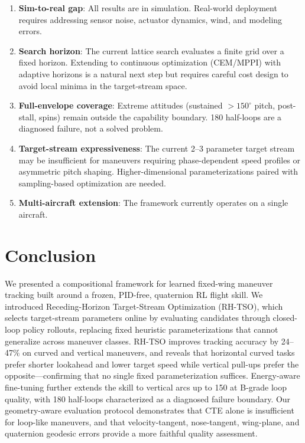 \documentclass{article}
\begin{document}
\begin{enumerate}
  \item \textbf{Sim-to-real gap}: All results are in simulation. Real-world deployment requires addressing sensor noise, actuator dynamics, wind, and modeling errors.
  \item \textbf{Search horizon}: The current lattice search evaluates a finite grid over a fixed horizon. Extending to continuous optimization (CEM/MPPI) with adaptive horizons is a natural next step but requires careful cost design to avoid local minima in the target-stream space.
  \item \textbf{Full-envelope coverage}: Extreme attitudes (sustained $>150^\circ$ pitch, post-stall, spins) remain outside the capability boundary. 180\textdegree{} half-loops are a diagnosed failure, not a solved problem.
  \item \textbf{Target-stream expressiveness}: The current 2--3 parameter target stream may be insufficient for maneuvers requiring phase-dependent speed profiles or asymmetric pitch shaping. Higher-dimensional parameterizations paired with sampling-based optimization are needed.
  \item \textbf{Multi-aircraft extension}: The framework currently operates on a single aircraft.
\end{enumerate}


\section{Conclusion}

We presented a compositional framework for learned fixed-wing maneuver tracking built around a frozen, PID-free, quaternion RL flight skill.
We introduced Receding-Horizon Target-Stream Optimization (RH-TSO), which selects target-stream parameters online by evaluating candidates through closed-loop policy rollouts, replacing fixed heuristic parameterizations that cannot generalize across maneuver classes.
RH-TSO improves tracking accuracy by 24--47\% on curved and vertical maneuvers, and reveals that horizontal curved tasks prefer shorter lookahead and lower target speed while vertical pull-ups prefer the opposite---confirming that no single fixed parameterization suffices.
Energy-aware fine-tuning further extends the skill to vertical arcs up to 150\textdegree{} at B-grade loop quality, with 180\textdegree{} half-loops characterized as a diagnosed failure boundary.
Our geometry-aware evaluation protocol demonstrates that CTE alone is insufficient for loop-like maneuvers, and that velocity-tangent, nose-tangent, wing-plane, and quaternion geodesic errors provide a more faithful quality assessment.
\end{document}
